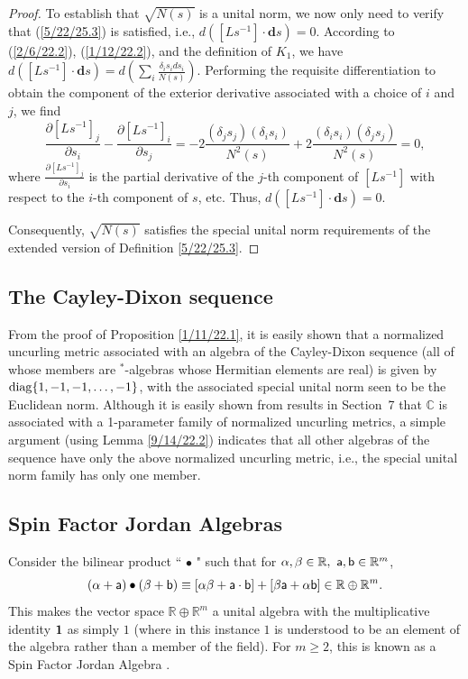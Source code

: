 \documentclass{amsart}
\theoremstyle{definition}
\numberwithin{theorem}{section}
\numberwithin{equation}{section}
\begin{document}
\begin{proof}
 To establish that $\sqrt{N(s)}$ is a unital norm, we  now only need to verify that (\ref{5/22/25.3}) is satisfied, i.e., $d\left([Ls^{-1}]\cdot \mathbf{d}s\right)=0$.  According to (\ref{2/6/22.2}), (\ref{1/12/22.2}), and the definition  of $K_1$, we have $d\left([Ls^{-1}]\cdot \mathbf{d}s\right) = d\left(\sum_i \frac{\delta_is_i ds_i}{N(s)}\right)$.  Performing the requisite differentiation to obtain the component of the exterior derivative associated with a choice of $i$ and $j$, we find \[ \frac{\partial [Ls^{-1}]_j}{\partial s_i} - \frac{\partial [Ls^{-1}]_i}{\partial s_j} = -2\frac{(\delta_j s_j)(\delta_i s_i)}{N^2(s)} +
2\frac{(\delta_i s_i)(\delta_j s_j)}{N^2(s)} = 0,  \] where $\frac{\partial [Ls^{-1}]_j}{\partial s_i}$ is the partial derivative of the $j$-th component of $[Ls^{-1}]$ with respect to the $i$-th component of $s$, etc. Thus,  $d\left([Ls^{-1}]\cdot \mathbf{d}s\right) = 0$.

Consequently, $\sqrt{N(s)}$ satisfies the special unital norm requirements of the extended version of Definition \ref{5/22/25.3}.  
\end{proof}


\subsection{The Cayley-Dixon sequence}  From the proof of Proposition \ref{1/11/22.1}, it is easily shown that a normalized uncurling metric associated with an algebra of the Cayley-Dixon sequence (all of whose members are $^*$-algebras whose Hermitian elements are real) is given by ${\rm diag}\{1,-1,-1,\dots,-1\}$, with the associated special unital norm seen to be the Euclidean norm. Although it is easily shown from results in \mbox{Section 7} that $\mathbb{C}$ is associated with a 1-parameter family of normalized uncurling metrics, a simple argument (using Lemma \ref{9/14/22.2}) indicates that all other algebras of the sequence have only the above normalized uncurling metric, i.e., the special unital norm family has only one member.  
 
\subsection{Spin Factor Jordan Algebras}  Consider the bilinear product ``$\,\bullet\,$" such that for
$\alpha,\beta\in \mathbb{R},\,\, {\sf a},{\sf b}\in \mathbb{R}^m$,  \begin{equation}  (\alpha+ {\sf a})\bullet (\beta + {\sf b}) \equiv
    [\alpha \beta + {\sf a} \cdot {\sf b}] + [ \beta {\sf a} + \alpha {\sf b}] \in \mathbb{R}\oplus \mathbb{R}^m. \label{12/24/18.1}\end{equation}  This makes the vector space $\mathbb{R}\oplus \mathbb{R}^m$ a unital algebra with the multiplicative identity ${\bf 1}$ as simply $1$ (where in this instance $1$ is understood to be an element of the algebra rather than a member of the field).  For $m\ge 2$, this is known as a Spin Factor Jordan Algebra \cite{mccrimmon:2004}.
\end{document}
